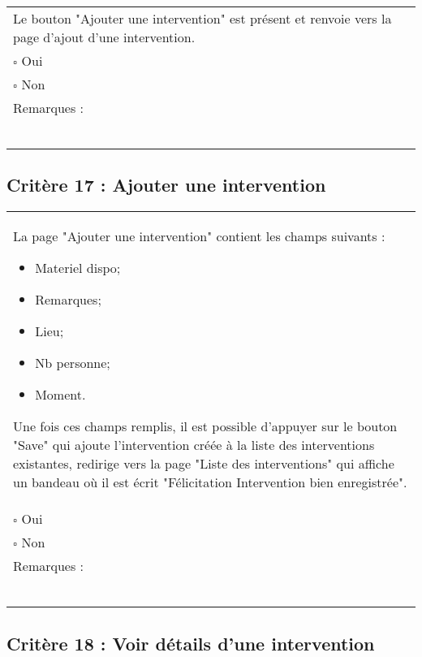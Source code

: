 	\begin{center}
    	 		\begin{tabular}[h]{|p{}|}
			\hline
				Le bouton "Ajouter une intervention" est présent et renvoie vers la page d'ajout d'une intervention. \\
				$\square$ Oui  \\ $\square$ Non \\\hline Remarques : \\ ~\\
			 \\\hline
     		\end{tabular}
  		\end{center}	
  		
  		
  	\subsection*{Critère 17 : Ajouter une intervention}
	
	\begin{center}
    	 		\begin{tabular}[h]{|p{}|}
			\hline
				La page "Ajouter une intervention"  contient les champs suivants : 
				\begin{itemize}
					\item Materiel dispo;
					\item Remarques;
					\item Lieu;
					\item Nb personne;
					\item Moment.
				\end{itemize}
				Une fois ces champs remplis, il est possible d'appuyer sur le bouton "Save" qui ajoute l'intervention créée à la liste des interventions existantes, redirige vers la page "Liste des interventions" qui affiche un bandeau où il est écrit "Félicitation Intervention bien enregistrée". \\
				$\square$ Oui  \\ $\square$ Non \\\hline Remarques : \\ ~\\
			 \\\hline
     		\end{tabular}
  		\end{center}	
  		
  		
  		\subsection*{Critère 18 : Voir détails d'une intervention}
	
